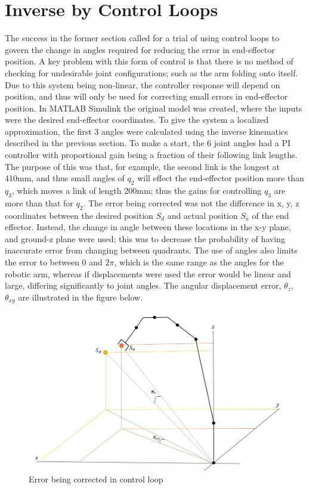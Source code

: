 \documentclass[12pt,openany,a4paper]{book}
\begin{document}
\section{Inverse by Control Loops}
The success in the former section called for a trial of using control loops to govern the change in angles required for reducing the error in end-effector position. A key problem with this form of control is that there is no method of checking for undesirable joint configurations; such as the arm folding onto itself. Due to this system being non-linear, the controller response will depend on position, and thus will only be used for correcting small errors in end-effector position. In MATLAB Simulink the original model was created, where the inputs were the desired end-effector coordinates. To give the system a localized approximation, the first 3 angles were calculated using the inverse kinematics described in the previous section. To make a start, the 6 joint angles had a PI controller with proportional gain being a fraction of their following link lengths. The purpose of this was that, for example, the second link is the longest at 410mm, and thus small angles of $q_2$ will effect the end-effector position more than $q_3$, which moves a link of length 200mm; thus the gains for controlling $q_3$ are more than that for $q_2$. The error being corrected was not the difference in x, y, z coordinates between the desired position $S_d$ and actual position $S_a$ of the end effector. Instead, the change in angle between these locations in the x-y plane, and ground-z plane were used; this was to decrease the probability of having inaccurate error from changing between quadrants. The use of angles also limits the error to between 0 and $2\pi$, which is the same range as the angles for the robotic arm, whereas if displacements were used the error would be linear and large, differing significantly to joint angles. The angular displacement error, $\theta_z$, $\theta_{xy}$ are illustrated in the figure below.


\begin{center}
\begin{figure}[htb]
  \includegraphics[width=1\linewidth]{jaco_inv_control_figure.jpg}
\caption{Error being corrected in control loop}
\end{figure}
\end{center}
\end{document}
